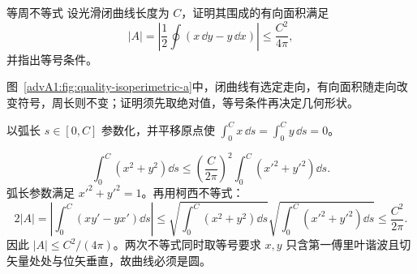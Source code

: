\begin{advexamplebox}{等周不等式}\label{advA1:ex:isoperimetric}
设光滑闭曲线长度为 $C$，证明其围成的有向面积满足
\[
 |A|=\left|\frac12\oint(x\,\dd y-y\,\dd x)\right|
 \le\frac{C^2}{4\pi},
\]
并指出等号条件。

\begin{qualityfigure}
\label{advA1:fig:quality-isoperimetric-q}
\end{qualityfigure}
\end{advexamplebox}
\begin{advsolution}
\begin{qualityfigure}
\label{advA1:fig:quality-isoperimetric-a}
\end{qualityfigure}
图~\ref{advA1:fig:quality-isoperimetric-a}中，闭曲线有选定走向，有向面积随走向改变符号，周长则不变；证明须先取绝对值，等号条件再决定几何形状。

以弧长 $s\in[0,C]$ 参数化，并平移原点使
$\int_0^C x\,\dd s=\int_0^C y\,\dd s=0$。%

\[
 \int_0^C(x^2+y^2)\dd s\le
 \left(\frac{C}{2\pi}\right)^2
 \int_0^C(x'^2+y'^2)\dd s.
\]
弧长参数满足 $x'^2+y'^2=1$。再用柯西不等式：
\[
 2|A|=\left|\int_0^C(xy'-yx')\dd s\right|
 \le\sqrt{\int_0^C(x^2+y^2)\dd s}
 \sqrt{\int_0^C(x'^2+y'^2)\dd s}
 \le\frac{C^2}{2\pi}.
\]
因此 $|A|\le C^2/(4\pi)$。两次不等式同时取等号要求
$x,y$ 只含第一傅里叶谐波且切矢量处处与位矢垂直，故曲线必须是圆。
\end{advsolution}

